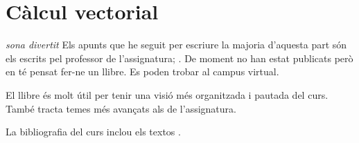 \documentclass[../../main.tex]{subfiles}
\begin{document}
\chapter{Càlcul vectorial}
    \emph{sona divertit}
    \printbibliography
    Els apunts que he seguit per escriure la majoria d'aquesta part són els escrits pel professor de l'assignatura; \cite{ApuntsBrunaEspai, ApuntsBrunaDiff, ApuntsBrunaInt, ApuntsBrunaVect}.
    De moment no han estat publicats però en té pensat fer-ne un llibre.
    Es poden trobar al campus virtual.

    El llibre \cite{apostol1974mathematical} és molt útil per tenir una visió més organitzada i pautada del curs.
    També tracta temes més avançats als de l'assignatura.

    La bibliografia del curs inclou els textos \cite{MarsdenTrombaCalculoVectorial, WendellFlemingFSoV, BressoudDavidSecondYearCalculus}.
\end{document}
